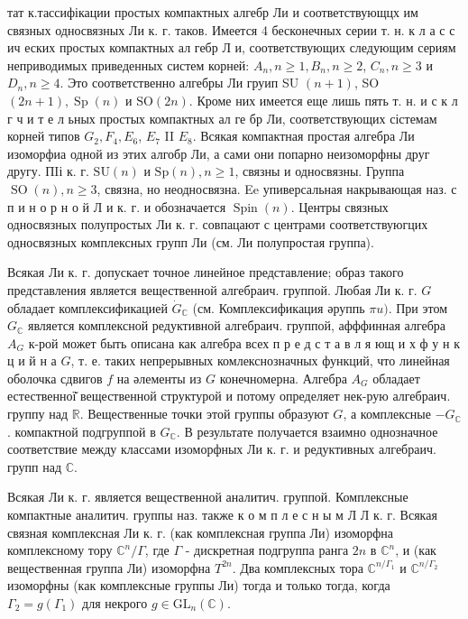 \documentclass[10pt]{article}
\begin{document}
тат к.тассифікации простых компактных алгебр Ли и соответствующцх им связных односвязных Ли к. г. таков. Имеется 4 бесконечных серии т. н. к л а с с ич еских простых компактных ал гебр Л и, соответствующих следующим сериям неприводимых приведенных систем корней: $A_{n}, n \geqslant 1, B_{n}, n \geqslant 2$, $C_{n}, n \geqslant 3$ и $D_{n}, n \geqslant 4$. Это соответственно алгебры Ли груип SU $(n+1)$, SO $(2 n+1), \operatorname{Sp}(n)$ и $\mathrm{SO}(2 n)$. Кроме них имеется еще лишь пять т. н. и с к л г ч и т е л ьных простых компактных ал ге бр Ли, соответствующих сістемам корней типов $G_{2}, F_{4}, E_{6}$, $E_{7}$ II $E_{8}$. Всякая компактная простая алгебра Ли изоморфиа одной из этих алгобр Ли, а сами они попарно неизоморфны друг другу. ПIі к. г. $\mathrm{SU}(n)$ и $\mathrm{Sp}(n), n \geqslant 1$, связны и односвязны. Группа $\operatorname{SO}(n), n \geqslant 3$, связна, но неодносвязна. Ee упиверсальная накрывающая наз. с п и н о р н о й Л и к. г. и обозначается $\operatorname{Spin}(n)$. Центры связных односвязных полупростых Ли к. г. совпацают с центрами соответствуюгцих односвязных комплексных групп Ли (см. Ли полупростая группа).



Всякая Ли к. г. допускает точное линейное представление; образ такого представления является вещественной алгебраич. группой. Любая Ли к. г. $G$ обладает комплексификацией $\dot{G}_{\mathbb{C}}$ (см. Комплексификация әруппь $\pi u)$. При этом $G_{\mathbb{C}}$ является комплексной редуктивной алгебраич. группой, афффинная алгебра $A_{G}$ к-рой может быть описана как алгебра всех п р е д с т а в л я ющ и х ф у н к ц и й н а $G$, т. е. таких непрерывных комлекснозначных функций, что линейная оболочка сдвигов $f$ на әлементы из $G$ конечномерна. Алгебра $A_{G}$ обладает естественної̆ вещественной структурой и потому определяет нек-рую алгебраич. группу над $\mathbb{R}$. Вещественные точки этой группы образуют $G$, а комплексные $-G_{\mathbb{C}}$. компактной подгруппой в $G_{\mathbb{C}}$. В результате получается взаимно однозначное соответствие между классами изоморфных Ли к. г. и редуктивных алгебраич. групп над $\mathbb{C}$.



Всякая Ли к. г. является вещественной аналитич. группой. Комплексные компактные аналитич. группы наз. также к о м п л е с н ы м Л Л к. г. Всякая связная комплексная Ли к. г. (как комплексная группа Ли) изоморфна комплексному тору $\mathbb{C}^{n} / \Gamma$, где $\Gamma$ - дискретная подгруппа ранга $2 n$ в $\mathbb{C}^{n}$, и (как вещественная группа Ли) изоморфна $T^{2 n}$. Два комплексных тора $\mathbb{C}^{n / \Gamma_{1}}$ и $\mathbb{C}^{n / \Gamma_{2}}$ изоморфны (как комплексные группы Ли) тогда и только тогда, когда $\Gamma_{2}=g\left(\Gamma_{1}\right)$ для некрого $g \in \mathrm{GL}_{n}(\mathbb{C})$.
\end{document}
